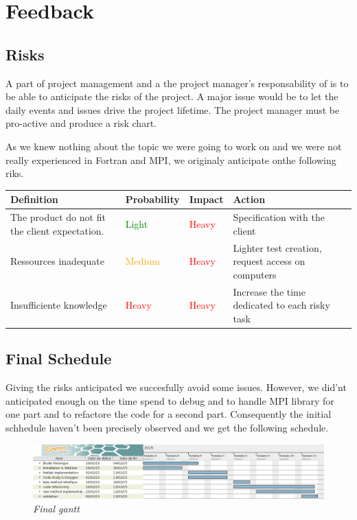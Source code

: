 \section{Feedback}
\subsection{Risks}
 A part of project management and a the project manager's responsability of is to be able to anticipate the risks of the project. A major issue would be to let the daily events and issues drive the project lifetime. The project manager must be pro-active and produce a risk chart.

As we knew nothing about the topic we were going to work on and we were not really experienced in Fortran and MPI, we originaly anticipate onthe following riks.
\begin{center}
\begin{tabular}{ | p{} |  p{} |  p{} |  p{}}
\hline
\textbf{Definition} & \textbf{Probability} & \textbf{Impact} & \textbf{Action}
\\

\hline
The product do not fit the client expectation. &
\textcolor{green}{Light} &
\textcolor{red}{Heavy} &
Specification with the client \\

\hline
Ressources inadequate &
\textcolor{orange}{Medium} &
\textcolor{red}{Heavy} &
Lighter test creation, request access on computers \\

\hline
Insufficiente knowledge &
\textcolor{red}{Heavy} &
\textcolor{red}{Heavy} &
Increase the time dedicated to each risky task \\
\hline
\end{tabular}
\end{center}

\subsection{Final Schedule}

Giving the risks anticipated we succesfully avoid some issues. However, we did'nt anticipated enough on the time spend to debug and to handle MPI library for one part and to refactore the code for a second part. Consequently the initial schhedule haven't been precisely observed and we get the following schedule. \\

\begin{figure}[h!]
\includegraphics[width=1\textwidth]{Image/gantt2.png}\centering
\caption{\textit{Final gantt}}
\end{figure}

